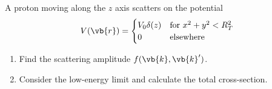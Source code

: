 \newpage
\setcounter{equation}{0}

\begin{esercizio}
   A proton moving along the $z$ axis scatters on the potential
   \begin{equation*}
      V(\vb{r})=
      \begin{cases}
         V_0 \delta(z) & \text{for } x^2 + y^2 < R_T^2\\
         0 & \text{elsewhere}
      \end{cases}
   \end{equation*}
   \begin{enumerate}[label=\alph*), leftmargin=0.6cm]
      \item Find the scattering amplitude $f(\vb{k},\vb{k}')$.\footnotemark
      \item Consider the low-energy limit and calculate the total cross-section.
   \end{enumerate}
\end{esercizio}

